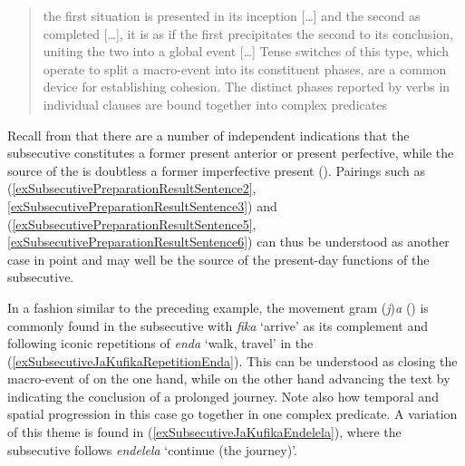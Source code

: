 \begin{quote}
the first situation is presented in its inception [\ldots] and the second as completed [\ldots], it is as if the first precipitates the second to its conclusion, uniting the two into a global event [\ldots] Tense switches of this type, which operate to split a macro-event into its constituent phases, are a common device for establishing cohesion. The distinct phases reported by verbs in individual clauses are bound together into complex predicates \citep[196f]{FleischmanS1990}
\end{quote}

Recall from   that there are a number of independent indications that the subsecutive constitutes a former present anterior or present perfective, while the source of the  is doubtless a former imperfective present (). Pairings such as (\ref{exSubsecutivePreparationResultSentence2}, \ref{exSubsecutivePreparationResultSentence3}) and (\ref{exSubsecutivePreparationResultSentence5}, \ref{exSubsecutivePreparationResultSentence6}) can thus be understood as another case in point and may well be the source of the present-day functions of the subsecutive. 

In a fashion similar to the preceding example, the movement gram (\textit{j})\textit{a} () is commonly found in the subsecutive with \textit{fika} `arrive' as its complement and following iconic repetitions of \textit{enda} `walk, travel' in the  (\ref{exSubsecutiveJaKufikaRepetitionEnda}). This can be understood as closing the macro-event of  on the one hand, while on the other hand advancing the text by indicating the conclusion of a prolonged journey. Note also how temporal and spatial progression in this case go together in one complex predicate. A variation of this theme is found in (\ref{exSubsecutiveJaKufikaEndelela}), where the subsecutive follows \textit{endelela} `continue (the journey)'.


